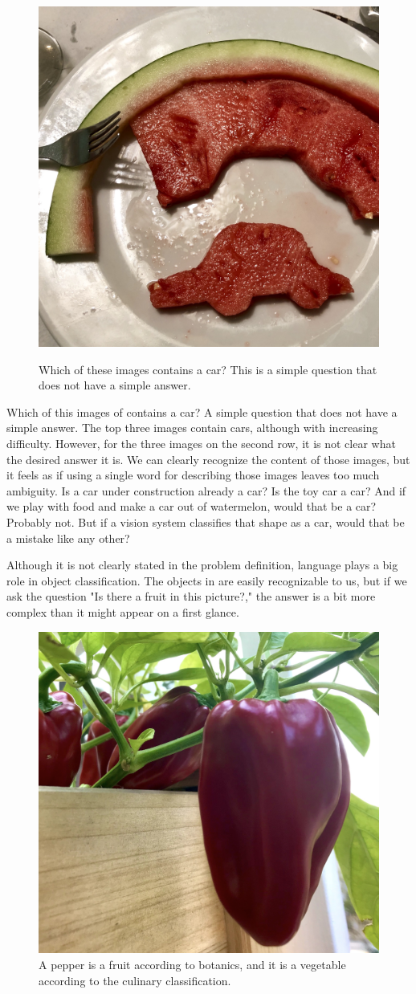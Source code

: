 \begin{figure}[t]
{        \includegraphics[width=0.32\linewidth]{figures/object_recognition/IMG_9325.jpeg}
    }
    \caption{Which of these images contains a car? This is a simple question that does not have a simple answer.}
    \label{fig:whatisacar}
\end{figure}

Which of this images of \fig{\ref{fig:whatisacar}} contains a car? A simple question that does not have a simple answer. The top three images contain cars, although with increasing difficulty. However, for the three images on the second row, it is not clear what the desired answer it is. We can clearly recognize the content of those images, but it feels as if using a single word for describing those images leaves too much ambiguity. Is a car under construction already a car? Is the toy car a car? And if we play with food and make a car out of watermelon, would that be a car? Probably not. But if a vision system classifies that shape as a car, would that be a mistake like any other?

Although it is not clearly stated in the problem definition, language plays a big role in object classification. The objects in \fig{\ref{fig:object_recognition_pepper}} are easily recognizable to us, but if we ask the question "Is there a fruit in this picture?," the answer is a bit more complex than it might appear on a first glance.


\begin{figure}[h]
    \centerline{
        \includegraphics[width=0.32\linewidth]{figures/object_recognition/pepper.jpg}
    }
    \caption{A pepper is a fruit according to botanics, and it is a vegetable according to the culinary classification.}
    \label{fig:object_recognition_pepper}
\end{figure}

